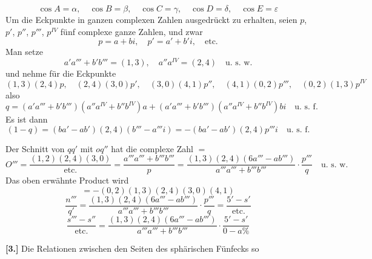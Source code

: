 \documentclass[10pt,a4paper]{article}
\begin{document}
\begin{equation*}
\cos A = \alpha, \quad \cos B = \beta, \quad \cos C = \gamma, \quad \cos D = \delta, \quad \cos E = \varepsilon
\end{equation*}
%
Um die Eckpunkte in ganzen complexen Zahlen ausgedr\"uckt zu erhalten, seien $p$, $p'$, $p''$, $p'''$, $p^{IV}$ f\"unf complexe ganze Zahlen, und zwar
%
\begin{equation*}
p = a + bi, \quad p' = a' + b'i, \quad \text{etc.}
\end{equation*}
%
Man setze
%
\begin{equation*}
a'a''' + b'b''' = (1, 3), \quad a''a^{IV} = (2, 4) \quad \text{u.\ s.\ w.}
\end{equation*}
%
und nehme f\"ur die Eckpunkte
%
\begin{equation*}
(1, 3)(2, 4)p, \quad (2, 4)(3, 0)p', \quad (3, 0)(4, 1)p'', \quad (4, 1)(0, 2)p''', \quad (0, 2)(1, 3)p^{IV}
\end{equation*}
%
also
%
\begin{equation*}
q = (a'a''' + b'b''')(a''a^{IV} + b''b^{IV})a + (a'a''' + b'b''')(a''a^{IV} + b''b^{IV})bi \quad \text{u.\ s.\ f.}
\end{equation*}
%
Es ist dann
%
\begin{equation*}
(1 - q) = (ba' - ab')(2, 4)(b''' - a'''i) = -(ba' - ab')(2, 4)p'''i \quad \text{u.\ s.\ f.}
\end{equation*}

Der Schnitt von $qq'$ mit $oq''$ hat die complexe Zahl $=$
%
\begin{equation*}
O''' = \frac{(1, 2)(2, 4)(3, 0)}{\text{etc.}} = \frac{a'''a''' + b'''b'''}{p} = \frac{(1, 3)(2, 4)(6a''' - ab''')}{a'''a''' + b'''b'''} \cdot \frac{p'''}{q}\quad \text{u.\ s.\ w.}
\end{equation*}
%
Das oben erw\"ahnte Product wird
%
\begin{equation*}
= -(0, 2)(1, 3)(2, 4)(3, 0)(4, 1)
\end{equation*}
%
\begin{equation*}
\frac{n'''}{q'} = \frac{(1, 3)(2, 4)(6a''' - ab''')}{a'''a''' + b'''b'''} \cdot \frac{p'''}{q} = \frac{5' - s'}{\text{etc.}}
\end{equation*}
%
\begin{equation*}
\frac{s''' - s''}{\text{etc.}} = \frac{(1, 3)(2, 4)(6a''' - ab''')}{a'''a''' + b'''b'''} \cdot \frac{5' - s'}{0 - a\%}
\end{equation*}

\textbf{[3.]} Die Relationen zwischen den Seiten des sph\"arischen F\"unfecks so
\end{document}
